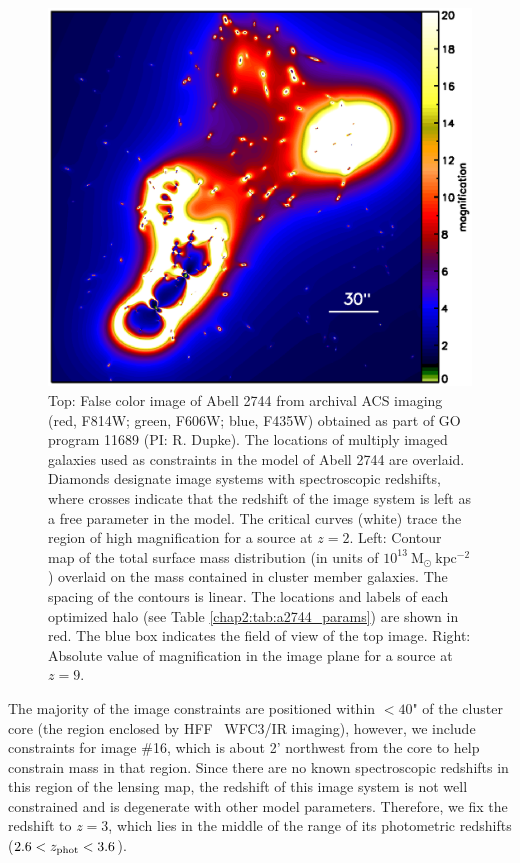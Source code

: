 \begin{figure}[h]
\includegraphics[height=0.28\textheight]{Chap2/c2f1c.eps}
\caption[Abell 2744 image constraints and critical curves]{Top: False color image of Abell 2744 from archival ACS imaging (red, F814W; green, F606W; blue, F435W) obtained as part of GO program 11689 (PI: R. Dupke). The locations of multiply imaged galaxies used as constraints in the model of Abell 2744 are overlaid. Diamonds designate image systems with spectroscopic redshifts, where crosses indicate that the redshift of the image system is left as a free parameter in the model. The critical curves (white) trace the region of high magnification for a source at $z=2$. Left: Contour map of the total surface mass distribution (in units of $10^{13}\ \mathrm{M_\odot \ kpc^{-2}}$) overlaid on the mass contained in cluster member galaxies. The spacing of the contours is linear. The locations and labels of each optimized halo (see Table \ref{chap2:tab:a2744_params}) are shown in red. The blue box indicates the field of view of the top image. Right: Absolute value of magnification in the image plane for a source at $z=9$.}
\label{chap2:fig:crit_a2744}
\end{figure}

The majority of the image constraints are positioned within $<40$" of the cluster core (the region enclosed by HFF \hst\ WFC3/IR imaging), however, we include constraints for image \#16, which is about 2' northwest from the core to help constrain mass in that region. Since there are no known spectroscopic redshifts in this region of the lensing map, the redshift of this image system is not well constrained and is degenerate with other model parameters. Therefore, we fix the redshift to $z=3$, which lies in the middle of the range of its photometric redshifts ($2.6<z_\mathrm{phot}<3.6$).

